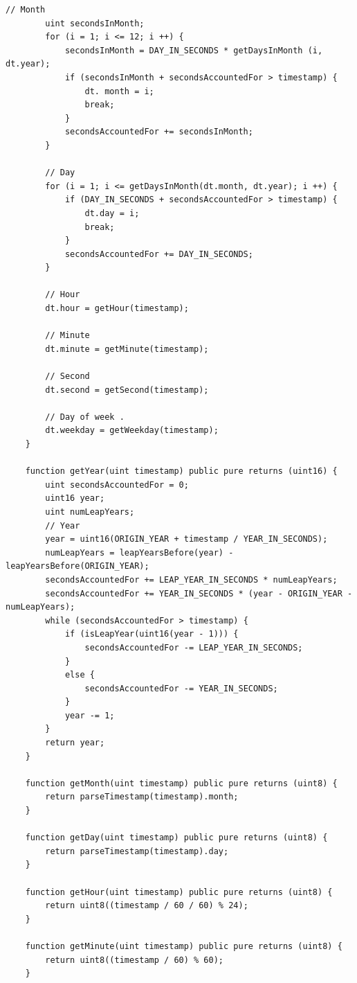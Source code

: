 \documentclass[a4paper]{article}
\begin{document}
\begin{frame}
\begin{lstlisting}[language = Solidity]
        // Month
        uint secondsInMonth;
        for (i = 1; i <= 12; i ++) {
            secondsInMonth = DAY_IN_SECONDS * getDaysInMonth (i, dt.year);
            if (secondsInMonth + secondsAccountedFor > timestamp) {
                dt. month = i;
                break;
            }
            secondsAccountedFor += secondsInMonth;
        }

        // Day
        for (i = 1; i <= getDaysInMonth(dt.month, dt.year); i ++) {
            if (DAY_IN_SECONDS + secondsAccountedFor > timestamp) {
                dt.day = i;
                break;
            }
            secondsAccountedFor += DAY_IN_SECONDS;
        }

        // Hour
        dt.hour = getHour(timestamp);

        // Minute
        dt.minute = getMinute(timestamp);

        // Second
        dt.second = getSecond(timestamp);

        // Day of week .
        dt.weekday = getWeekday(timestamp);
    }

    function getYear(uint timestamp) public pure returns (uint16) {
        uint secondsAccountedFor = 0;
        uint16 year;
        uint numLeapYears;
        // Year
        year = uint16(ORIGIN_YEAR + timestamp / YEAR_IN_SECONDS);
        numLeapYears = leapYearsBefore(year) - leapYearsBefore(ORIGIN_YEAR);
        secondsAccountedFor += LEAP_YEAR_IN_SECONDS * numLeapYears;
        secondsAccountedFor += YEAR_IN_SECONDS * (year - ORIGIN_YEAR - numLeapYears);
        while (secondsAccountedFor > timestamp) {
            if (isLeapYear(uint16(year - 1))) {
                secondsAccountedFor -= LEAP_YEAR_IN_SECONDS;
            }
            else {
                secondsAccountedFor -= YEAR_IN_SECONDS;
            }
            year -= 1;
        }
        return year;
    }
    
    function getMonth(uint timestamp) public pure returns (uint8) {
        return parseTimestamp(timestamp).month;
    }
    
    function getDay(uint timestamp) public pure returns (uint8) {
        return parseTimestamp(timestamp).day;
    }
    
    function getHour(uint timestamp) public pure returns (uint8) {
        return uint8((timestamp / 60 / 60) % 24);
    }
    
    function getMinute(uint timestamp) public pure returns (uint8) {
        return uint8((timestamp / 60) % 60);
    }
    

\end{lstlisting}
\end{frame}
\end{document}
